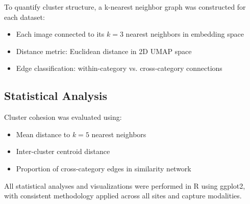 To quantify cluster structure, a k-nearest neighbor graph was constructed for each dataset:

\begin{itemize}
    \item Each image connected to its $k=3$ nearest neighbors in embedding space
    \item Distance metric: Euclidean distance in 2D UMAP space
    \item Edge classification: within-category vs. cross-category connections
\end{itemize}

\subsection{Statistical Analysis}

Cluster cohesion was evaluated using:
\begin{itemize}
    \item Mean distance to $k=5$ nearest neighbors
    \item Inter-cluster centroid distance
    \item Proportion of cross-category edges in similarity network
\end{itemize}

All statistical analyses and visualizations were performed in R using ggplot2, with consistent methodology applied across all sites and capture modalities.
